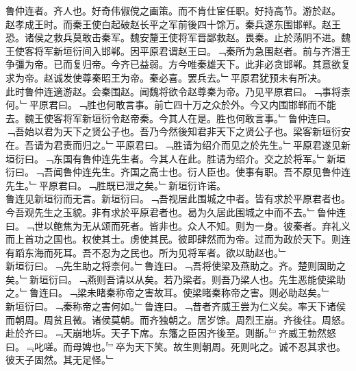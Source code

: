 \documentclass{zhvt-classic}
\begin{document}

\hspace*{2em}鲁仲连者。齐人也。好奇伟俶傥之画策。而不肯仕宦任职。好持高节。游於赵。\\
\hspace*{2em}赵孝成王时。而秦王使白起破赵长平之军前後四十馀万。秦兵遂东围邯郸。赵王恐。诸侯之救兵莫敢击秦军。魏安釐王使将军晋鄙救赵。畏秦。止於荡阴不进。魏王使客将军新垣衍间入邯郸。因平原君谓赵王曰。﹁秦所为急围赵者。前与齐湣王争彊为帝。已而复归帝。今齐已益弱。方今唯秦雄天下。此非必贪邯郸。其意欲复求为帝。赵诚发使尊秦昭王为帝。秦必喜。罢兵去。﹂平原君犹预未有所决。\\
\hspace*{2em}此时鲁仲连適游赵。会秦围赵。闻魏将欲令赵尊秦为帝。乃见平原君曰。﹁事将柰何。﹂平原君曰。﹁胜也何敢言事。前亡四十万之众於外。今又内围邯郸而不能去。魏王使客将军新垣衍令赵帝秦。今其人在是。胜也何敢言事。﹂鲁仲连曰。﹁吾始以君为天下之贤公子也。吾乃今然後知君非天下之贤公子也。梁客新垣衍安在。吾请为君责而归之。﹂平原君曰。﹁胜请为绍介而见之於先生。﹂平原君遂见新垣衍曰。﹁东国有鲁仲连先生者。今其人在此。胜请为绍介。交之於将军。﹂新垣衍曰。﹁吾闻鲁仲连先生。齐国之高士也。衍人臣也。使事有职。吾不原见鲁仲连先生。﹂平原君曰。﹁胜既已泄之矣。﹂新垣衍许诺。\\
\hspace*{2em}鲁连见新垣衍而无言。新垣衍曰。﹁吾视居此围城之中者。皆有求於平原君者也。今吾观先生之玉貌。非有求於平原君者也。曷为久居此围城之中而不去。﹂鲁仲连曰。﹁世以鲍焦为无从颂而死者。皆非也。众人不知。则为一身。彼秦者。弃礼义而上首功之国也。权使其士。虏使其民。彼即肆然而为帝。过而为政於天下。则连有蹈东海而死耳。吾不忍为之民也。所为见将军者。欲以助赵也。﹂\\
\hspace*{2em}新垣衍曰。﹁先生助之将柰何。﹂鲁连曰。﹁吾将使梁及燕助之。齐。楚则固助之矣。﹂新垣衍曰。﹁燕则吾请以从矣。若乃梁者。则吾乃梁人也。先生恶能使梁助之。﹂鲁连曰。﹁梁未睹秦称帝之害故耳。使梁睹秦称帝之害。则必助赵矣。﹂\\
\hspace*{2em}新垣衍曰。﹁秦称帝之害何如。﹂鲁连曰。﹁昔者齐威王尝为仁义矣。率天下诸侯而朝周。周贫且微。诸侯莫朝。而齐独朝之。居岁馀。周烈王崩。齐後往。周怒。赴於齐曰。﹃天崩地坼。天子下席。东籓之臣因齐後至。则斮。﹄齐威王勃然怒曰。﹃叱嗟。而母婢也。﹄卒为天下笑。故生则朝周。死则叱之。诚不忍其求也。彼天子固然。其无足怪。﹂\\
\end{document}
